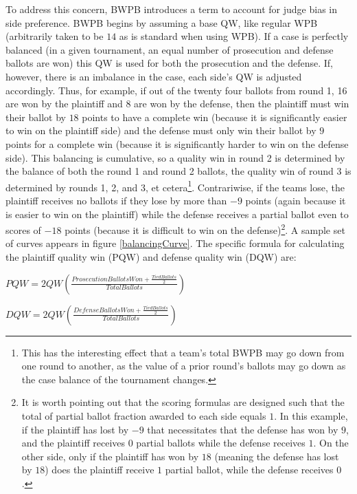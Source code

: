 \documentclass{article}
\begin{document}
To address this concern, BWPB introduces a term to account for judge bias in side preference.  BWPB begins by assuming a base QW, like regular WPB (arbitrarily taken to be $14$ as is standard when using WPB).  If a case is perfectly balanced (in a given tournament, an equal number of prosecution and defense ballots are won) this QW is used for both the prosecution and the defense.  If, however, there is an imbalance in the case, each side's QW is adjusted accordingly.  Thus, for example, if out of the twenty four ballots from round 1, 16 are won by the plaintiff and 8 are won by the defense, then the plaintiff must win their ballot by $18$ points to have a complete win (because it is significantly easier to win on the plaintiff side) and the defense must only win their ballot by $9$ points for a complete win (because it is significantly harder to win on the defense side).  This balancing is cumulative, so a quality win in round 2 is determined by the balance of both the round 1 and round 2 ballots, the quality win of round 3 is determined by rounds 1, 2, and 3, et cetera\footnote{This has the interesting effect that a team's total BWPB may go down from one round to another, as the value of a prior round's ballots may go down as the case balance of the tournament changes.}.  Contrariwise, if the teams lose, the plaintiff receives no ballots if they lose by more than $-9$ points (again because it is easier to win on the plaintiff) while the defense receives a partial ballot even to scores of $-18$ points (because it is difficult to win on the defense)\footnote{It is worth pointing out that the scoring formulas are designed such that the total of partial ballot fraction awarded to each side equals $1$.  In this example, if the plaintiff has lost by $-9$ that necessitates that the defense has won by $9$, and the plaintiff receives $0$ partial ballots while the defense receives $1$.  On the other side, only if the plaintiff has won by $18$ (meaning the defense has lost by $18$) does the plaintiff receive $1$ partial ballot, while the defense receives $0$.}.  A sample set of curves appears in figure \ref{balancingCurve}.  The specific formula for calculating the plaintiff quality win (PQW) and defense quality win (DQW) are:

$PQW=2QW\left(\frac{ProsecutionBallotsWon+\frac{TiedBallots}{2}}{TotalBallots}\right)$

$DQW=2QW\left(\frac{DefenseBallotsWon+\frac{TiedBallots}{2}}{TotalBallots}\right)$
\end{document}
